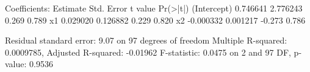 Coefficients:
             Estimate Std. Error t value Pr(>|t|)
(Intercept)  0.746641   2.776243   0.269    0.789
x1           0.029020   0.126882   0.229    0.820
x2          -0.000332   0.001217  -0.273    0.786

Residual standard error: 9.07 on 97 degrees of freedom
Multiple R-squared:  0.0009785,	Adjusted R-squared:  -0.01962 
F-statistic: 0.0475 on 2 and 97 DF,  p-value: 0.9536

